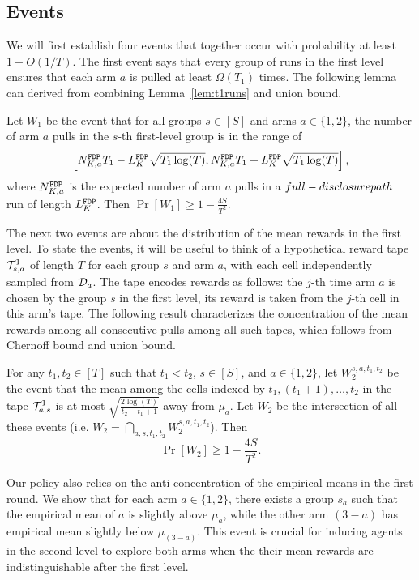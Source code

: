 \subsection{Events}
We will first establish four events that together occur
with probability at least $1 - O(1/T)$. The first event says that
every group of \ALGG runs in the first level ensures that each arm $a$
is pulled at least $\Omega(T_1)$ times. The following lemma can
derived from combining Lemma~\ref{lem:t1runs} and union bound.

\begin{lemma}\label{3levelw1}
  Let $W_1$ be the event that for all groups $s\in [S]$ and arms
  $a\in \{1, 2\}$, the number of arm $a$ pulls in the $s$-th
  first-level group is in the range of
  $$
  \left[N^\mathtt{FDP}_{K,a}  T_1- L^\mathtt{FDP}_K \sqrt{T_1\log(T)}, N^\mathtt{FDP}_{K,a}  T_1 + L^\mathtt{FDP}_K \sqrt{T_1\log(T)}\right],
  $$
  where $N^\mathtt{FDP}_{K,a} $ is the expected number of arm $a$ pulls in a $full-disclosure path$ run
  of length $L^\mathtt{FDP}_K$. Then $\Pr[W_1] \geq 1- \frac{4S}{T^2}$.
\end{lemma}


The next two events are about the distribution of the mean rewards in
the first level. To state the events, it will be useful to think of a
hypothetical reward tape $\mathcal{T}^1_{s, a}$ of length $T$ for each
group $s$ and arm $a$, with each cell independently sampled from
$\mathcal{D}_a$.  The tape encodes rewards as follows: the $j$-th time arm $a$
is chosen by the group $s$ in the first level, its reward is taken
from the $j$-th cell in this arm's tape. The following result
characterizes the concentration of the mean rewards among all
consecutive pulls among all such tapes, which follows from Chernoff
bound and union bound.

\begin{lemma}\label{3levelw2}
  For any $t_1, t_2\in [T]$ such that $t_1 < t_2$, $s\in [S]$, and
  $a\in \{1,2\}$, let $W_2^{s,a,t_1,t_2}$ be the event that the mean
  among the cells indexed by $t_1, (t_1+1), \ldots, t_2$ in the tape
  $\mathcal{T}^1_{a, s}$ is at most $\sqrt{\frac{2\log(T)}{t_2-t_1+1}}$ away
  from $\mu_a$.  Let $W_2$ be the intersection of all these events
  (i.e.  $W_2 = \bigcap_{a,s,t_1,t_2} W_2^{s,a,t_1,t_2}$). Then
  \[
    \Pr[W_2] \geq 1- \frac{4S}{T^2}.
  \]
\end{lemma}

Our policy also relies on the anti-concentration of the empirical
means in the first round. We show that for each arm $a\in \{1, 2\}$,
there exists a group $s_a$ such that the empirical mean of $a$ is
slightly above $\mu_a$, while the other arm $(3 - a)$ has empirical
mean slightly below $\mu_{(3-a)}$. This event is crucial for inducing
agents in the second level to explore both arms when the their
mean rewards are indistinguishable after the first level.


